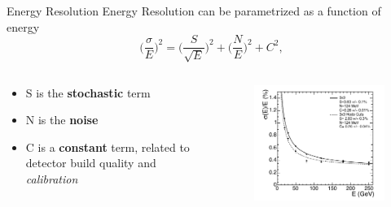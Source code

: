 \documentclass[10pt]{beamer}
\begin{document}
\begin{frame}{Energy Resolution}
    Energy Resolution can be parametrized as a function of energy
    \begin{equation}
        \biggl(\frac{\sigma}{E}\biggr)^2 = \biggl(\frac{S}{\sqrt{E}}\biggr)^2 + \biggl(\frac{N}{E}\biggr)^2 + C^2 ,
    \end{equation}
  
    \begin{columns}
        \begin{column}[]{0.45\textwidth}
        \begin{itemize}
            \item S is the \textbf{stochastic} term
            \item N is the \textbf{noise} 
            \item C is a \textbf{constant} term, related to detector build quality and \emph{calibration}
        \end{itemize}
        \end{column}
        \begin{column}[]{0.45\textwidth}
            \begin{figure}
            \includegraphics[width=\textwidth]{./img/res_energy.png}
            \end{figure}
        \end{column}
    \end{columns}
    
\end{frame}
\end{document}
